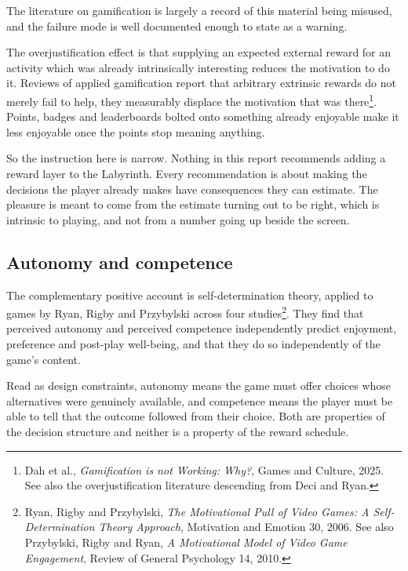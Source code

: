 \documentclass[11pt,a4paper]{article}
\begin{document}
The literature on gamification is largely a record of this material being misused, and the
failure mode is well documented enough to state as a warning.

The overjustification effect is that supplying an expected external reward for an activity which
was already intrinsically interesting reduces the motivation to do it. Reviews of applied
gamification report that arbitrary extrinsic rewards do not merely fail to help, they measurably
displace the motivation that was there\footnote{Dah et al., \emph{Gamification is not Working:
Why?}, Games and Culture, 2025. See also the overjustification literature descending from Deci
and Ryan.}. Points, badges and leaderboards bolted onto something already enjoyable make it less
enjoyable once the points stop meaning anything.

\begin{alarmbox}
So the instruction here is narrow. Nothing in this report recommends adding a reward layer to the
Labyrinth. Every recommendation is about making the decisions the player already makes have
consequences they can estimate. The pleasure is meant to come from the estimate turning out to
be right, which is intrinsic to playing, and not from a number going up beside the screen.
\end{alarmbox}

\subsection{Autonomy and competence}

The complementary positive account is self-determination theory, applied to games by Ryan, Rigby
and Przybylski across four studies\footnote{Ryan, Rigby and Przybylski, \emph{The Motivational
Pull of Video Games: A Self-Determination Theory Approach}, Motivation and Emotion 30, 2006. See
also Przybylski, Rigby and Ryan, \emph{A Motivational Model of Video Game Engagement}, Review of
General Psychology 14, 2010.}. They find that perceived autonomy and perceived competence
independently predict enjoyment, preference and post-play well-being, and that they do so
independently of the game's content.

Read as design constraints, autonomy means the game must offer choices whose alternatives were
genuinely available, and competence means the player must be able to tell that the outcome
followed from their choice. Both are properties of the decision structure and neither is a
property of the reward schedule.
\end{document}
